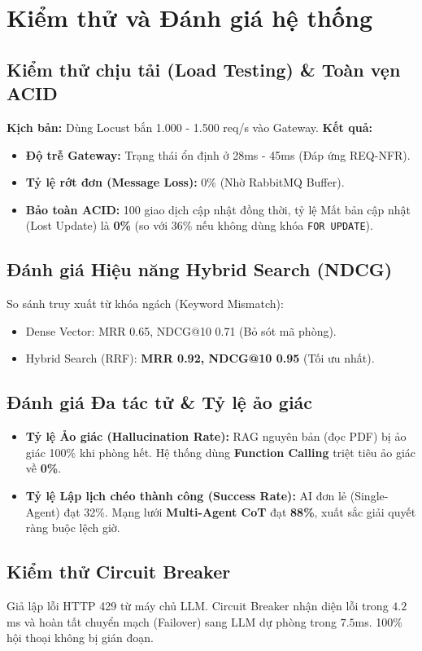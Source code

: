\section{Kiểm thử và Đánh giá hệ thống}

\subsection{Kiểm thử chịu tải (Load Testing) \& Toàn vẹn ACID}
\textbf{Kịch bản:} Dùng Locust bắn 1.000 - 1.500 req/s vào Gateway.
\textbf{Kết quả:}
\begin{itemize}
    \item \textbf{Độ trễ Gateway:} Trạng thái ổn định ở 28ms - 45ms (Đáp ứng REQ-NFR).
    \item \textbf{Tỷ lệ rớt đơn (Message Loss):} 0\% (Nhờ RabbitMQ Buffer).
    \item \textbf{Bảo toàn ACID:} 100 giao dịch cập nhật đồng thời, tỷ lệ Mất bản cập nhật (Lost Update) là \textbf{0\%} (so với 36\% nếu không dùng khóa \texttt{FOR UPDATE}).
\end{itemize}

\subsection{Đánh giá Hiệu năng Hybrid Search (NDCG)}
So sánh truy xuất từ khóa ngách (Keyword Mismatch):
\begin{itemize}
    \item Dense Vector: MRR 0.65, NDCG@10 0.71 (Bỏ sót mã phòng).
    \item Hybrid Search (RRF): \textbf{MRR 0.92, NDCG@10 0.95} (Tối ưu nhất).
\end{itemize}

\subsection{Đánh giá Đa tác tử \& Tỷ lệ ảo giác}
\begin{itemize}
    \item \textbf{Tỷ lệ Ảo giác (Hallucination Rate):} RAG nguyên bản (đọc PDF) bị ảo giác 100\% khi phòng hết. Hệ thống dùng \textbf{Function Calling} triệt tiêu ảo giác về \textbf{0\%}.
    \item \textbf{Tỷ lệ Lập lịch chéo thành công (Success Rate):} AI đơn lẻ (Single-Agent) đạt 32\%. Mạng lưới \textbf{Multi-Agent CoT} đạt \textbf{88\%}, xuất sắc giải quyết ràng buộc lệch giờ.
\end{itemize}

\subsection{Kiểm thử Circuit Breaker}
Giả lập lỗi HTTP 429 từ máy chủ LLM. Circuit Breaker nhận diện lỗi trong $4.2$ms và hoàn tất chuyển mạch (Failover) sang LLM dự phòng trong $7.5$ms. 100\% hội thoại không bị gián đoạn.
